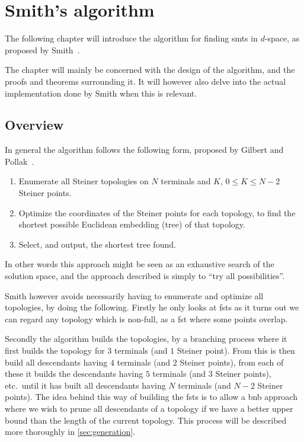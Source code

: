 { \abnormalparskip{0pt}
\chapter{Smith's algorithm}
\label{cha:algorithm} }


The following chapter will introduce the algorithm for finding \glspl{smt} in
$d$-space, as proposed by Smith~\cite{smith1992}.

The chapter will mainly be concerned with the design of the algorithm, and the
proofs and theorems surrounding it. It will however also delve into the actual
implementation done by Smith when this is relevant.

\section{Overview}
\label{sec:overview}

In general the algorithm follows the following form, proposed by Gilbert and
Pollak~\cite{gilbert1968}.

\begin{enumerate}
\item Enumerate all Steiner topologies on $N$ terminals and $K$, $0 \le K \le
N-2$ Steiner points.
\item Optimize the coordinates of the Steiner points for each topology, to find
the shortest possible Euclidean embedding (tree) of that topology.
\item Select, and output, the shortest tree found.
\end{enumerate}

In other words this approach might be seen as an exhaustive search of the
solution space, and the approach described is simply to ``try all
possibilities''.

Smith however avoids necessarily having to enumerate and optimize all
topologies, by doing the following. Firstly he only looks at \glspl{fst} as it
turns out we can regard any topology which is non-full, as a \gls{fst} where
some points overlap.

Secondly the algorithm builds the topologies, by a branching process where it
first builds the topology for $3$ terminals (and $1$ Steiner point). From this
is then build all descendants having $4$ terminals (and $2$ Steiner points),
from each of these it builds the descendants having $5$ terminals (and $3$
Steiner points), etc.\ until it has built all descendants having $N$ terminals
(and $N-2$ Steiner points). The idea behind this way of building the
\glspl{fst} is to allow a \gls{bnb} approach where we wish to prune all
descendants of a topology if we have a better upper bound than the length of the
current topology. This process will be described more thoroughly in
\cref{sec:generation}.

